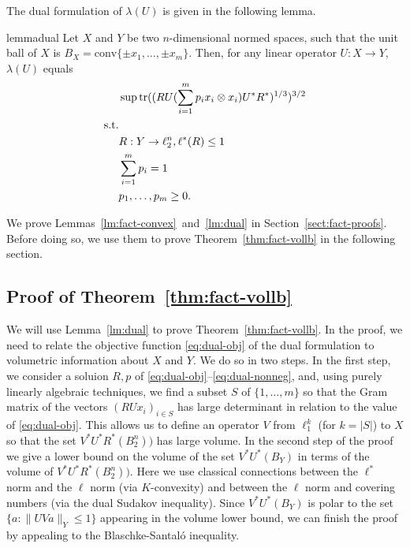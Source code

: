 \documentclass[11pt]{article}
\DeclareMathOperator{\tr}{tr}
\begin{document}
The dual formulation of $\lambda(U)$ is given in the following lemma. 
\begin{restatable}{lemma}{dual}
  \label{lm:dual}
  Let $X$ and $Y$ be two $n$-dimensional normed spaces, such that the
  unit ball of $X$ is $B_X = \mathrm{conv}\{\pm x_1, \ldots, \pm
  x_m\}$. Then, for any linear operator $U:X \to Y$, $\lambda(U)$
  equals
  \begin{align}
    &\sup \tr((RU(\sum_{i = 1}^m{p_i x_i \otimes  x_i})U^*R^*)^{1/3})^{3/2}\label{eq:dual-obj}\\
    \text{s.t.}\notag\\
    &R: Y \to \ell_2^n, \ell^*(R) \le 1 \label{eq:dual-ellstar}\\
    &\sum_{i = 1}^m{p_i} = 1\label{eq:dual-prob}\\
    &p_1, \ldots, p_m \ge 0. \label{eq:dual-nonneg}
  \end{align}
\end{restatable}

We prove Lemmas~\ref{lm:fact-convex}~and~\ref{lm:dual} in
Section~\ref{sect:fact-proofs}. Before doing so, we use them to prove
Theorem~\ref{thm:fact-vollb} in the following section. 

\subsection{Proof of Theorem~\ref{thm:fact-vollb}}
\label{sect:fact-pf}

We will use Lemma~\ref{lm:dual} to prove Theorem~\ref{thm:fact-vollb}.
In the proof, we need to relate the objective function
\eqref{eq:dual-obj} of the dual formulation to volumetric information
about $X$ and $Y$. We do so in two steps. In the first step, we
consider a soluion $R, p$ of
\eqref{eq:dual-obj}--\eqref{eq:dual-nonneg}, and, using purely
linearly algebraic techniques, we find a subset $S$ of $\{1, \ldots,
m\}$ so that the Gram matrix of the vectors $(RUx_i)_{i \in S}$ has large
determinant  in relation to the value of
\eqref{eq:dual-obj}. This allows us to define an operator $V$ from
$\ell_1^k$ (for  $k = |S|$) to $X$ so that the set
$V^*U^*R^*(B_2^n))$ has large volume. In the second step of the proof
we give a lower bound on the volume of the set $V^*U^*(B_Y)$ in terms
of the volume of $V^*U^*R^*(B_2^n))$. Here we use classical
connections between the $\ell^*$ norm and the $\ell$ norm (via
$K$-convexity) and between the $\ell$ norm and covering numbers (via
the dual Sudakov inequality). Since $V^*U^*(B_Y)$ is polar to the set
$\{a: \|UVa\|_Y \le 1\}$ appearing in the volume lower bound, we can
finish the proof by appealing to the Blaschke-Santal\'o inequality.
\end{document}

